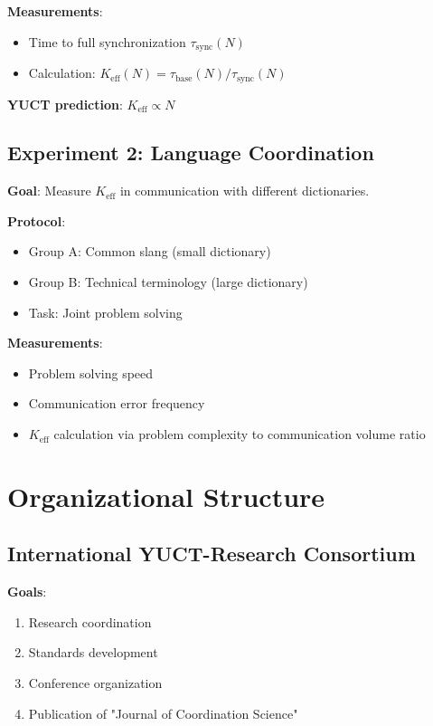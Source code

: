 \documentclass[12pt,a4paper]{article}
\begin{document}
	\textbf{Measurements}:
	\begin{itemize}
		\item Time to full synchronization $\tau_{\mathrm{sync}}(N)$
		\item Calculation: $K_{\mathrm{eff}}(N) = \tau_{\mathrm{base}}(N)/\tau_{\mathrm{sync}}(N)$
	\end{itemize}
	
	\textbf{YUCT prediction}: $K_{\mathrm{eff}} \propto N$
	
	\subsection{Experiment 2: Language Coordination}
	
	\textbf{Goal}: Measure $K_{\mathrm{eff}}$ in communication with different dictionaries.
	
	\textbf{Protocol}:
	\begin{itemize}
		\item Group A: Common slang (small dictionary)
		\item Group B: Technical terminology (large dictionary)
		\item Task: Joint problem solving
	\end{itemize}
	
	\textbf{Measurements}:
	\begin{itemize}
		\item Problem solving speed
		\item Communication error frequency
		\item $K_{\mathrm{eff}}$ calculation via problem complexity to communication volume ratio
	\end{itemize}
	
	\section{Organizational Structure}
	
	\subsection{International YUCT-Research Consortium}
	
	\textbf{Goals}:
	\begin{enumerate}
		\item Research coordination
		\item Standards development
		\item Conference organization
		\item Publication of "Journal of Coordination Science"
	\end{enumerate}
	
\end{document}
